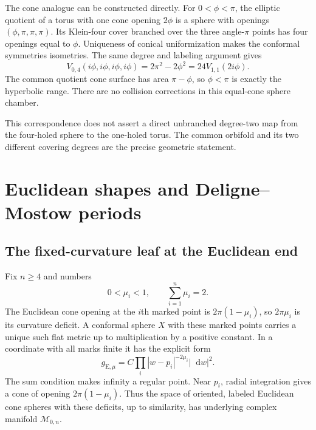 \documentclass[11pt,a4paper]{article}
\numberwithin{equation}{section}
\theoremstyle{definition}
\theoremstyle{remark}
\newcommand{\dd}{\mathop{}\!\mathrm d}
\newcommand{\M}{\mathcal M}
\begin{document}
The cone analogue can be constructed directly. For $0<\phi<\pi$, the
elliptic quotient of a torus with one cone opening $2\phi$ is a sphere
with openings $(\phi,\pi,\pi,\pi)$. Its Klein-four cover branched over
the three angle-$\pi$ points has four openings equal to $\phi$. Uniqueness
of conical uniformization makes the conformal symmetries isometries.
The same degree and labeling argument gives
\begin{equation}
 V_{0,4}(i\phi,i\phi,i\phi,i\phi)
   =2\pi^2-2\phi^2=24V_{1,1}(2i\phi).
 \label{eq:conetorus}
\end{equation}
The common quotient cone surface has area $\pi-\phi$, so $\phi<\pi$ is exactly the
hyperbolic range. There are no collision corrections in this equal-cone
sphere chamber.

This correspondence does not assert a direct unbranched degree-two map
from the four-holed sphere to the one-holed torus. The common orbifold and
its two different covering degrees are the precise geometric statement.

\section{Euclidean shapes and Deligne--Mostow periods}
\label{sec:thurstonDM}

\subsection{The fixed-curvature leaf at the Euclidean end}

Fix $n\ge4$ and numbers
\begin{equation}
 0<\mu_i<1,\qquad \sum_{i=1}^n\mu_i=2.
 \label{eq:flatweights}
\end{equation}
The Euclidean cone opening at the $i$th marked point is
$2\pi(1-\mu_i)$, so $2\pi\mu_i$ is its curvature deficit. A conformal
sphere $X$ with these marked points carries a unique such flat metric up
to multiplication by a positive constant. In a coordinate with all marks
finite it has the explicit form
\begin{equation}
 g_{\mathrm E,\mu}=C\prod_i|w-p_i|^{-2\mu_i}|\dd w|^2.
 \label{eq:flatconemetric}
\end{equation}
The sum condition makes infinity a regular point. Near $p_i$, radial
integration gives a cone of opening $2\pi(1-\mu_i)$. Thus the space of
oriented, labeled Euclidean cone spheres with these deficits, up to
similarity, has underlying complex manifold $\M_{0,n}$.
\end{document}
